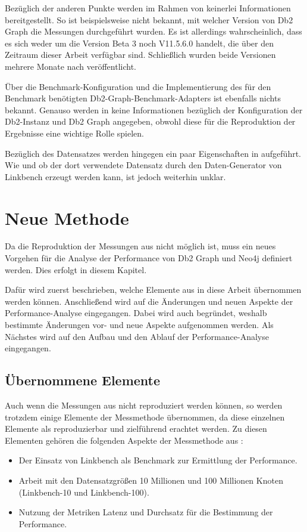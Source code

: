 Bezüglich der anderen Punkte werden im Rahmen von \cite{sigmod_tian} keinerlei Informationen bereitgestellt. So ist beispielsweise nicht bekannt, mit welcher Version von Db2 Graph die Messungen durchgeführt wurden. Es ist allerdings wahrscheinlich, dass es sich weder um die Version Beta 3 noch V11.5.6.0 handelt, die über den Zeitraum dieser Arbeit verfügbar sind. Schließlich wurden beide Versionen mehrere Monate nach \cite{sigmod_tian} veröffentlicht. 

Über die Benchmark-Konfiguration und die Implementierung des für den Benchmark benötigten Db2-Graph-Benchmark-Adapters ist ebenfalls nichts bekannt. Genauso werden in \cite{sigmod_tian} keine Informationen bezüglich der Konfiguration der Db2-Instanz und Db2 Graph angegeben, obwohl diese für die Reproduktion der Ergebnisse eine wichtige Rolle spielen. 

Bezüglich des Datensatzes werden hingegen ein paar Eigenschaften in \cite{sigmod_tian} aufgeführt. Wie und ob der dort verwendete Datensatz durch den Daten-Generator von Linkbench erzeugt werden kann, ist jedoch weiterhin unklar.

\section{Neue Methode}
Da die Reproduktion der Messungen aus \cite{sigmod_tian} nicht möglich ist, muss ein neues Vorgehen für die Analyse der Performance von Db2 Graph und Neo4j definiert werden. Dies erfolgt in diesem Kapitel. 

Dafür wird zuerst beschrieben, welche Elemente aus \cite{sigmod_tian} in diese Arbeit übernommen werden können. Anschließend wird auf die Änderungen und neuen Aspekte der Performance-Analyse eingegangen. Dabei wird auch begründet, weshalb bestimmte Änderungen vor- und neue Aspekte aufgenommen werden. Als Nächstes wird auf den Aufbau und den Ablauf der Performance-Analyse eingegangen. 

\subsection{Übernommene Elemente}
Auch wenn die Messungen aus \cite{sigmod_tian} nicht reproduziert werden können, so werden trotzdem einige Elemente der Messmethode übernommen, da diese einzelnen Elemente als reproduzierbar und zielführend erachtet werden. Zu diesen Elementen gehören die folgenden Aspekte der Messmethode aus \cite{sigmod_tian}:
\begin{itemize}
    \item Der Einsatz von Linkbench als Benchmark zur Ermittlung der Performance.
    \item Arbeit mit den Datensatzgrößen 10 Millionen und 100 Millionen Knoten (Linkbench-10 und Linkbench-100).
    \item Nutzung der Metriken Latenz und Durchsatz für die Bestimmung der Performance.  
\end{itemize}

